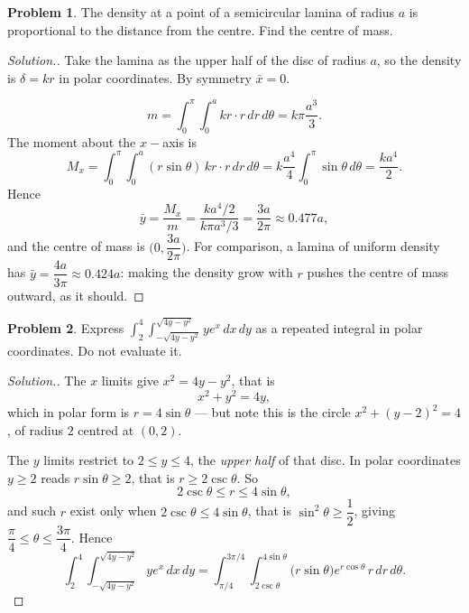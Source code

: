 \documentclass[11pt,a4paper]{article}
\theoremstyle{definition}
\newtheorem{problemx}{Problem}[subsection]
\newenvironment{problem}{\begin{problemx}}{\end{problemx}}
\newenvironment{solution}
  {\renewcommand{\qedsymbol}{}\begin{proof}[\textit{Solution}.]}
  {\end{proof}}
\begin{document}
\begin{problem}
The density at a point of a semicircular lamina of radius $a$ is proportional to
the distance from the centre. Find the centre of mass.
\end{problem}
\begin{solution}
Take the lamina as the upper half of the disc of radius $a$, so the density is
$\delta = kr$ in polar coordinates. By symmetry $\bar x = 0$.

$$m = \int_0^{\pi}\int_0^a kr\cdot r\,dr\,d\theta
= k\pi\frac{a^3}{3}.$$
The moment about the $x-$axis is
$$M_x = \int_0^{\pi}\int_0^a (r\sin\theta)\,kr\cdot r\,dr\,d\theta
= k\frac{a^4}{4}\int_0^{\pi}\sin\theta\,d\theta = \frac{ka^4}{2}.$$
Hence
$$\bar y = \frac{M_x}{m} = \frac{ka^4/2}{k\pi a^3/3} = \frac{3a}{2\pi}
\approx 0.477a ,$$
and the centre of mass is $\Big(0, \dfrac{3a}{2\pi}\Big)$. For comparison, a
lamina of uniform density has $\bar y = \dfrac{4a}{3\pi}\approx 0.424a$: making
the density grow with $r$ pushes the centre of mass outward, as it should.
\end{solution}

\begin{problem}
Express
$\displaystyle{\int_2^4\int_{-\sqrt{4y-y^2}}^{\sqrt{4y-y^2}}ye^x\,dx\,dy}$
as a repeated integral in polar coordinates. Do not evaluate it.
\end{problem}
\begin{solution}
The $x$ limits give $x^2 = 4y-y^2$, that is
$$x^2+y^2 = 4y ,$$
which in polar form is $r = 4\sin\theta$ --- but note this is the circle
$x^2+(y-2)^2 = 4$, of radius $2$ centred at $(0,2)$.

The $y$ limits restrict to $2\leq y\leq 4$, the \emph{upper half} of that disc.
In polar coordinates $y\geq 2$ reads $r\sin\theta\geq 2$, that is
$r\geq 2\csc\theta$. So
$$2\csc\theta \leq r \leq 4\sin\theta ,$$
and such $r$ exist only when $2\csc\theta\leq 4\sin\theta$, that is
$\sin^2\theta\geq\dfrac12$, giving
$\dfrac{\pi}{4}\leq\theta\leq\dfrac{3\pi}{4}$. Hence
$$\int_2^4\int_{-\sqrt{4y-y^2}}^{\sqrt{4y-y^2}}ye^x\,dx\,dy
= \int_{\pi/4}^{3\pi/4}\int_{2\csc\theta}^{4\sin\theta}
\big(r\sin\theta\big)e^{r\cos\theta}\,r\,dr\,d\theta .$$
\end{solution}
\end{document}
